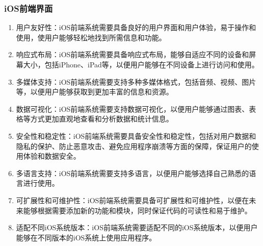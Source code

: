 \documentclass[UTF8]{ctexart}
\newcommand{\m}[1]{\textcolor{modify}{#1}}
\begin{document}
    \subsubsection{iOS前端界面}
    \m{
        \begin{enumerate}
            \item 用户友好性：iOS前端系统需要具备良好的用户界面和用户体验，易于操作和使用，使用户能够轻松地找到所需信息和功能。
            \item 响应式布局：iOS前端系统需要具备响应式布局，能够自适应不同的设备和屏幕大小，包括iPhone、iPad等，以便用户能够在不同设备上进行访问和使用。
            \item 多媒体支持：iOS前端系统需要支持多种多媒体格式，包括音频、视频、图片等，以便用户能够获取到更加丰富的信息和资源。
            \item 数据可视化：iOS前端系统需要支持数据可视化，以便用户能够通过图表、表格等方式更加直观地查看和分析数据和统计信息。
            \item 安全性和稳定性：iOS前端系统需要具备安全性和稳定性，包括对用户数据和隐私的保护、防止恶意攻击、避免应用程序崩溃等方面的保障，保证用户的使用体验和数据安全。
            \item 多语言支持：iOS前端系统需要支持多语言，以便用户能够选择自己熟悉的语言进行使用。
            \item 可扩展性和可维护性：iOS前端系统需要具备可扩展性和可维护性，以便在未来能够根据需要添加新的功能和模块，同时保证代码的可读性和易于维护。
            \item 适配不同iOS系统版本：iOS前端系统需要适配不同的iOS系统版本，以便用户能够在不同版本的iOS系统上使用应用程序。
            \end{enumerate}
    }
\end{document}
